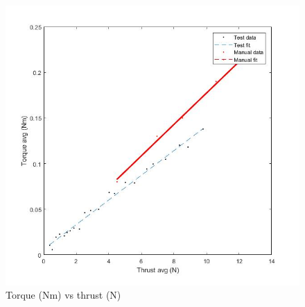 \documentclass[12pt, reqno]{article}
\begin{document}
\begin{figure}[H]
	\centering
	\includegraphics[width=0.4\columnwidth]{C_tau}
	\caption{Torque (Nm) vs thrust (N)}\label{fig1}
\end{figure}
\end{document}
